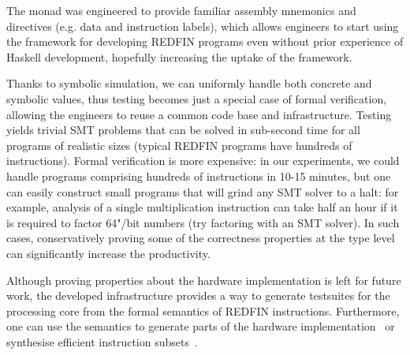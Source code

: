 
The  monad was engineered to provide familiar assembly mnemonics and
directives (e.g. data and instruction labels), which allows engineers to start
using the framework for developing REDFIN programs even without prior experience
of Haskell development, hopefully increasing the uptake of the framework.

Thanks to symbolic simulation, we can uniformly handle both concrete and
symbolic values, thus testing becomes just a special case of formal verification,
allowing the engineers to reuse a common code base and infrastructure.
Testing yields trivial SMT problems that can be solved in sub-second time for
all programs of realistic sizes (typical REDFIN programs have hundreds of
instructions). Formal verification is more expensive: in our experiments, we
could handle programs comprising hundreds of instructions in 10-15 minutes, but
one can easily construct small programs that will grind any SMT solver to a halt:
for example, analysis of a single multiplication instruction  can take
half an hour if it is required to factor 64"/bit numbers (try factoring
 with an SMT solver). In such cases, conservatively proving
some of the correctness properties at the type level can significantly increase
the productivity.

Although proving properties about the hardware implementation is left for future
work, the developed infrastructure provides a way to generate testsuites for the
processing core from the formal semantics of REDFIN instructions. Furthermore,
one can use the semantics to generate parts of the hardware
implementation~\cite{reid2016cav} or synthesise efficient instruction
subsets~\cite{mokhov2014synthesis}.
